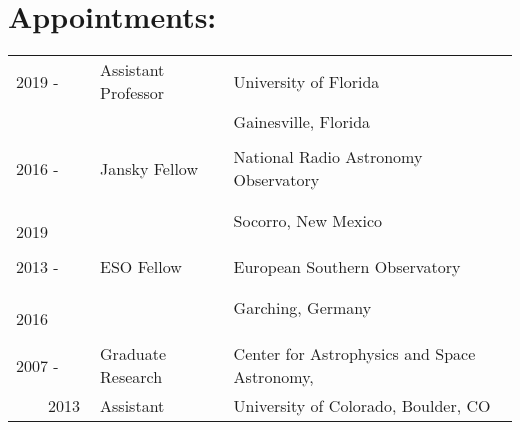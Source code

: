 \documentclass[12pt]{article}
\begin{document}
\section*{Appointments:}
\begin{listliketab}
    \begin{tabular}{p{0.7in}p{1.6in}p{5in}}
    2019 -      & Assistant Professor & University of Florida \\
                                     && Gainesville, Florida \\
                                     \smallskip \\
    2016 -  & Jansky Fellow  & National Radio Astronomy Observatory\\
         2019   &         & Socorro, New Mexico \\
                                     \smallskip \\
    2013 -  & ESO Fellow  & European Southern Observatory\\
        2016    &         & Garching, Germany \\
                                     \smallskip \\
    2007 -  & Graduate Research & Center for Astrophysics and Space Astronomy, \\
    2013    &   Assistant                & University of Colorado, Boulder, CO \\
    \end{tabular}
\end{listliketab}


%
\end{document}
